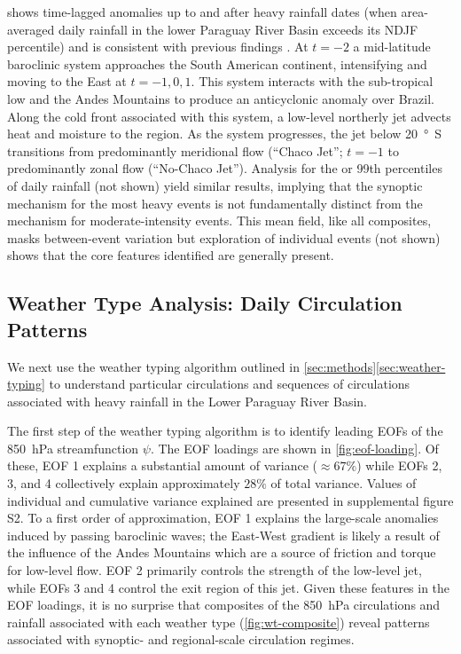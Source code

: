 \documentclass[twocol]{ametsoc}
\begin{document}
 shows time-lagged anomalies up to and after heavy rainfall dates (when area-averaged daily rainfall in the lower Paraguay River Basin exceeds its NDJF  percentile) and is consistent with previous findings \citep{Marengo2004,Salio:2007gd,Marwan2015}.
At $t=-2$ a mid-latitude baroclinic system approaches the South American continent, intensifying and moving to the East at $t=-1,0,1$.
This system interacts with the sub-tropical low and the Andes Mountains to produce an anticyclonic anomaly over Brazil.
Along the cold front associated with this system, a low-level northerly jet advects  heat and moisture to the region.
As the system progresses, the jet below \SI{20}{\degree S} transitions from predominantly meridional flow (``Chaco Jet''; $t=-1$ to predominantly zonal flow (``No-Chaco Jet'').
Analysis for the  or 99th percentiles of daily rainfall (not shown) yield similar results, implying that the synoptic mechanism for the most heavy events is not fundamentally distinct from the mechanism for moderate-intensity events.
This mean field, like all composites, masks between-event variation but exploration of individual events (not shown) shows that the core features identified are generally present.

\subsection{Weather Type Analysis: Daily Circulation Patterns} \label{sec:weather-types}

We next use the weather typing algorithm outlined in \cref{sec:methods}\ref{sec:weather-typing} to understand particular circulations and sequences of circulations associated with heavy rainfall in the Lower Paraguay River Basin.

The first step of the weather typing algorithm is to identify leading EOFs of the \SI{850}{\hecto\pascal} streamfunction $\psi$.
The EOF loadings are shown in \cref{fig:eof-loading}.
Of these, EOF 1 explains a substantial amount of variance ($\approx 67\%$) while EOFs 2, 3, and 4 collectively explain approximately $28\%$ of total variance.
Values of individual and cumulative variance explained are presented in supplemental figure S2.
To a first order of approximation, EOF 1 explains the large-scale anomalies induced by passing baroclinic waves; the East-West gradient is likely a result of the influence of the Andes Mountains which are a source of friction and torque for low-level flow.
EOF 2 primarily controls the strength of the low-level jet, while EOFs 3 and 4 control the exit region of this jet.
Given these features in the EOF loadings, it is no surprise that composites of the  \SI{850}{\hecto\pascal} circulations and rainfall associated with each weather type (\cref{fig:wt-composite}) reveal patterns associated with synoptic- and regional-scale circulation regimes.
\end{document}
